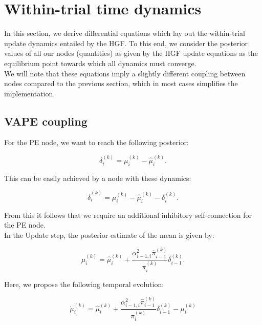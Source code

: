 \section{Within-trial time dynamics}

In this section, we derive differential equations which lay out the within-trial update dynamics entailed by the HGF. To this end, we consider the posterior values of all our nodes (quantities) as given by the HGF update equations as the equilibrium point towards which all dynamics must converge. \\

We will note that these equations imply a slightly different coupling between nodes compared to the previous section, which in most cases simplifies the implementation.

\subsection{VAPE coupling}

For the \textsf{PE} node, we want to reach the following posterior:

\begin{equation}
	\delta_i^{(k)} = \mu_i^{(k)} - \hat{\mu}_i^{(k)}.
\end{equation}

This can be easily achieved by a node with these dynamics:

\begin{equation}
	\dot{\delta}_i^{(k)} = \mu_i^{(k)} - \hat{\mu}_i^{(k)} - \delta_i^{(k)}.
\end{equation}

From this it follows that we require an additional inhibitory self-connection for the \textsf{PE} node.\\

In the \textsf{Update} step, the posterior estimate of the mean is given by:

\begin{equation}
	\mu_i^{(k)} = \hat{\mu}_i^{(k)} + \frac{\alpha_{i-1,i}^2 \hat{\pi}_{i-1}^{(k)}}{\pi_i^{(k)}} \delta_{i-1}^{(k)}.
\end{equation}

Here, we propose the following temporal evolution:

\begin{equation}
	\dot{\mu}_i^{(k)} = \hat{\mu}_i^{(k)} + \frac{\alpha_{i-1,i}^2 \hat{\pi}_{i-1}^{(k)}}{\pi_i^{(k)}} \delta_{i-1}^{(k)} - \mu_i^{(k)}
\end{equation}

